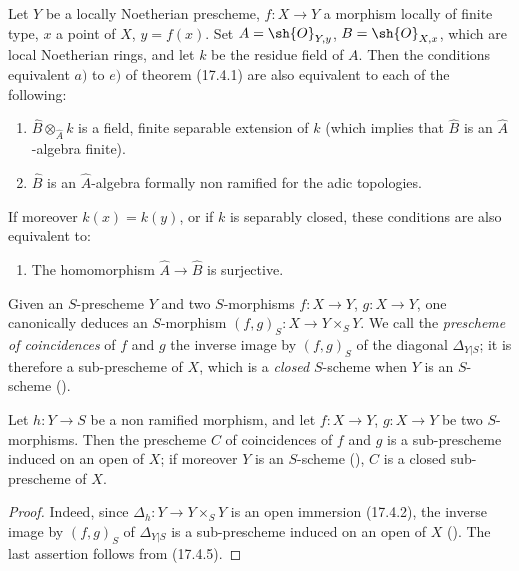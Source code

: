 \begin{proposition}[17.4.4]
\label{IV.17.4.4}
Let $Y$ be a locally Noetherian prescheme, $f:X\to Y$ a morphism locally of finite type, $x$ a point of $X$, $y=f(x)$.
Set $A=\sh{O}_{Y,y}$, $B=\sh{O}_{X,x}$, which are local Noetherian rings, and let $k$ be the residue field of $A$.
Then the conditions equivalent $a)$ to $e)$ of theorem (17.4.1) are also equivalent to each of the following:
\begin{enumerate}
  \item[f)] $\hat{B}\otimes_{\hat{A}}k$ is a field, finite separable extension of $k$ (which implies that $\hat{B}$ is an $\hat{A}$-algebra finite).
  \item[f')] $\hat{B}$ is an $\hat{A}$-algebra formally non ramified for the adic topologies.
\end{enumerate}
If moreover $k(x)=k(y)$, or if $k$ is separably closed, these conditions are also equivalent to:
\begin{enumerate}
  \item[f'')] The homomorphism $\hat{A}\to\hat{B}$ is surjective.
\end{enumerate}
\end{proposition}

\begin{env}[17.4.5]
\label{IV.17.4.5}
Given an $S$-prescheme $Y$ and two $S$-morphisms $f:X\to Y$, $g:X\to Y$, one canonically deduces an $S$-morphism $(f,g)_S:X\to Y\times_S Y$.
We call the \emph{prescheme of coincidences} of $f$ and $g$ the inverse image by $(f,g)_S$ of the diagonal $\Delta_{Y|S}$; it is therefore a sub-prescheme of $X$, which is a \emph{closed} $S$-scheme when $Y$ is an $S$-scheme ().
\end{env}

\begin{proposition}[17.4.6]
\label{IV.17.4.6}
Let $h:Y\to S$ be a non ramified morphism, and let $f:X\to Y$, $g:X\to Y$ be two $S$-morphisms.
Then the prescheme $C$ of coincidences of $f$ and $g$ is a sub-prescheme induced on an open of $X$; if moreover $Y$ is an $S$-scheme (), $C$ is a closed sub-prescheme of $X$.
\end{proposition}

\begin{proof}
Indeed, since $\Delta_h:Y\to Y\times_S Y$ is an open immersion (17.4.2), the inverse image by $(f,g)_S$ of $\Delta_{Y|S}$ is a sub-prescheme induced on an open of $X$ ().
The last assertion follows from (17.4.5).
\end{proof}

